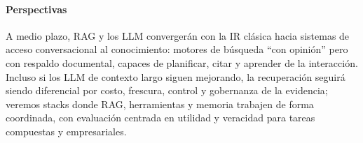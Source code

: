 \paragraph{Perspectivas}
A medio plazo, RAG y los LLM convergerán con la IR clásica hacia sistemas de acceso conversacional al conocimiento: motores de búsqueda “con opinión” pero con 
respaldo documental, capaces de planificar, citar y aprender de la interacción. Incluso si los LLM de contexto largo siguen mejorando, la recuperación seguirá 
siendo diferencial por costo, frescura, control y gobernanza de la evidencia; veremos stacks donde RAG, herramientas y memoria trabajen de forma coordinada, 
con evaluación centrada en utilidad y veracidad para tareas compuestas y empresariales.

